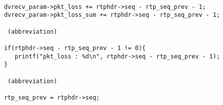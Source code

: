 \begin{verbatim}

 dvrecv_param->pkt_loss += rtphdr->seq - rtp_seq_prev - 1;
 dvrecv_param->pkt_loss_sum += rtphdr->seq - rtp_seq_prev - 1;

  (abbreviation)

 if(rtphdr->seq - rtp_seq_prev - 1 != 0){
    printf("pkt_loss : %d\n", rtphdr->seq - rtp_seq_prev - 1);
 }

  (abbreviation)

 rtp_seq_prev = rtphdr->seq;

\end{verbatim}
